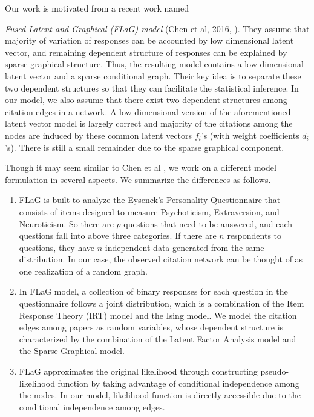 \documentclass[AMS,STIX1COL]{WileyNJD-v2}
\begin{document}
Our work is motivated from a recent work named {\emph{Fused Latent and Graphical (FLaG) model} (Chen et al, 2016, \cite{chen2016fused}).
They assume that majority of variation of responses can be accounted by low dimensional latent vector, and remaining dependent structure of responses can be explained by sparse graphical structure.
Thus, the resulting model contains a low-dimensional latent vector and a sparse conditional graph.
Their key idea is to separate these two dependent structures so that they can facilitate the statistical inference.
In our model, we also assume that there exist two dependent structures among citation edges in a network.
A low-dimensional version of the aforementioned latent vector model is largely correct and majority of the citations among the nodes are induced by these common latent vectors $f_{i}$'s (with weight coefficients $d_{i}$'s).
There is still a small remainder due to the sparse graphical component.

Though it may seem similar to Chen et al \cite{chen2016fused}, we work on a different model formulation in several aspects.
We summarize the differences as follows.
\begin{enumerate}
\item FLaG is built to analyze the Eysenck's Personality Questionnaire that consists of items designed to measure Psychoticism, Extraversion, and Neuroticism.
    So there are $p$ questions that need to be answered, and each questions fall into above three categories.
    If there are $n$ respondents to questions, they have $n$ independent data generated from the same distribution.
    In our case, the observed citation network can be thought of as one realization of a random graph.

\item In FLaG model, a collection of binary responses for each question in the questionnaire follows a joint distribution, which is a combination of the Item Response Theory (IRT) model and the Ising model.
    We model the citation edges among papers as random variables, whose dependent structure is characterized by the combination of the Latent Factor Analysis model and the Sparse Graphical model.

\item FLaG approximates the original likelihood through constructing pseudo-likelihood function by taking advantage of conditional independence among the nodes.
    In our model, likelihood function is directly accessible due to the conditional independence among edges.
\end{enumerate}

}
\end{document}
